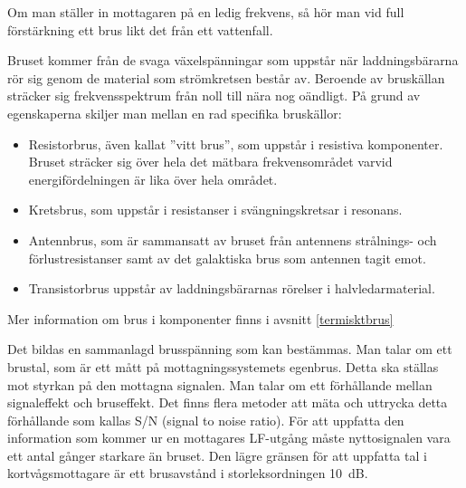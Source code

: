 Om man ställer in mottagaren på en ledig frekvens, så hör man vid full
förstärkning ett brus likt det från ett vattenfall.

Bruset kommer från de svaga växelspänningar som uppstår när
laddningsbärarna rör sig genom de material som strömkretsen består av.
Beroende av bruskällan sträcker sig frekvensspektrum från noll
till nära nog oändligt.
På grund av egenskaperna skiljer man mellan en rad specifika bruskällor:

\begin{itemize}
\item Resistorbrus, även kallat ''vitt brus'', som uppstår i resistiva
  komponenter.
  Bruset sträcker sig över hela det mätbara frekvensområdet varvid
  energifördelningen är lika över hela området.

\item Kretsbrus, som uppstår i resistanser i svängningskretsar i resonans.

\item Antennbrus, som är sammansatt av bruset från antennens
  strålnings- och förlustresistanser samt av det galaktiska brus som
  antennen tagit emot.

\item Transistorbrus uppstår av laddningsbärarnas rörelser i
  halvledarmaterial.
\end{itemize}

Mer information om brus i komponenter finns i avsnitt \ref{termisktbrus}

Det bildas en sammanlagd brusspänning som kan bestämmas.
Man talar om ett brustal, som är ett mått på mottagningssystemets egenbrus.
Detta ska ställas mot styrkan på den mottagna signalen.
Man talar om ett förhållande mellan signaleffekt och bruseffekt.
Det finns flera metoder att mäta och uttrycka detta förhållande som kallas
S/N (signal to noise ratio).
För att uppfatta den information som kommer ur en mottagares LF-utgång måste
nyttosignalen vara ett antal gånger starkare än bruset.
Den lägre gränsen för att uppfatta tal i kortvågsmottagare är ett brusavstånd
i storleksordningen 10~dB.

